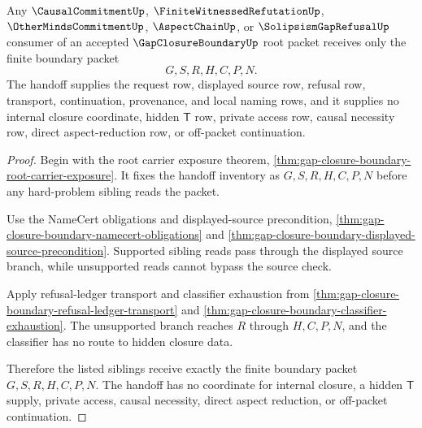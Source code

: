 \begin{theorem}
\label{thm:gap-closure-boundary-root-sibling-handoff}
Any $\CausalCommitmentUp$, $\FiniteWitnessedRefutationUp$, $\OtherMindsCommitmentUp$, $\AspectChainUp$, or $\SolipsismGapRefusalUp$ consumer of an accepted $\GapClosureBoundaryUp$ root packet receives only the finite boundary packet
$$
G,S,R,H,C,P,N.
$$
The handoff supplies the request row, displayed source row, refusal row, transport, continuation, provenance, and local naming rows, and it supplies no internal closure coordinate, hidden $\mathsf{T}$ row, private access row, causal necessity row, direct aspect-reduction row, or off-packet continuation.
\end{theorem}
\begin{proof}
Begin with the root carrier exposure theorem, \autoref{thm:gap-closure-boundary-root-carrier-exposure}. It fixes the handoff inventory as $G,S,R,H,C,P,N$ before any hard-problem sibling reads the packet.

Use the NameCert obligations and displayed-source precondition, \autoref{thm:gap-closure-boundary-namecert-obligations} and \autoref{thm:gap-closure-boundary-displayed-source-precondition}. Supported sibling reads pass through the displayed source branch, while unsupported reads cannot bypass the source check.

Apply refusal-ledger transport and classifier exhaustion from \autoref{thm:gap-closure-boundary-refusal-ledger-transport} and \autoref{thm:gap-closure-boundary-classifier-exhaustion}. The unsupported branch reaches $R$ through $H,C,P,N$, and the classifier has no route to hidden closure data.

Therefore the listed siblings receive exactly the finite boundary packet $G,S,R,H,C,P,N$. The handoff has no coordinate for internal closure, a hidden $\mathsf{T}$ supply, private access, causal necessity, direct aspect reduction, or off-packet continuation.
\end{proof}

